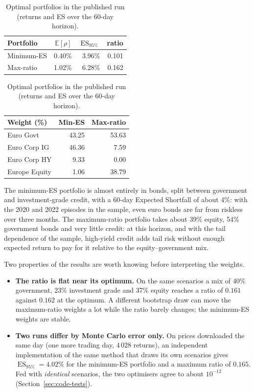 \documentclass[11pt,a4paper]{article}
\newcommand{\ES}{\operatorname{ES}}
\newcommand{\E}{\mathbb{E}}
\theoremstyle{plain}
\theoremstyle{remark}
\begin{document}
\begin{table}[htbp]
\centering
\begin{tabular}{lrrr}
\toprule
Portfolio & $\E[\rho]$ & $\ES_{95\%}$ & ratio \\
\midrule
Minimum-ES & 0.40\% & 3.96\% & 0.101 \\
Max-ratio  & 1.02\% & 6.28\% & 0.162 \\
\bottomrule
\end{tabular}
\qquad
\begin{tabular}{lrr}
\toprule
Weight (\%) & Min-ES & Max-ratio \\
\midrule
Euro Govt      & 43.25 & 53.63 \\
Euro Corp IG   & 46.36 &  7.59 \\
Euro Corp HY   &  9.33 &  0.00 \\
Europe Equity  &  1.06 & 38.79 \\
\bottomrule
\end{tabular}
\caption{Optimal portfolios in the published run (returns and ES over the
60-day horizon).}
\label{tab:results}
\end{table}

The minimum-ES portfolio is almost entirely in bonds, split between
government and investment-grade credit, with a 60-day Expected Shortfall of
about 4\%: with the 2020 and 2022 episodes in the sample, even euro bonds
are far from riskless over three months. The
maximum-ratio portfolio takes about 39\% equity, 54\% government bonds and
very little credit: at this horizon, and with the tail dependence of the
sample, high-yield credit adds tail risk without enough expected return to
pay for it relative to the equity--government mix.

Two properties of the results are worth knowing before interpreting the
weights.
\begin{itemize}[nosep]
  \item \textbf{The ratio is flat near its optimum.} On the same scenarios a
        mix of 40\% government, 23\% investment grade and 37\% equity reaches
        a ratio of $0.161$ against $0.162$ at the optimum. A different
        bootstrap draw can move the maximum-ratio weights a lot while the
        ratio barely changes; the minimum-ES weights are stable.
  \item \textbf{Two runs differ by Monte Carlo error only.} On prices
        downloaded the same day (one more trading day, $4\,028$ returns), an
        independent implementation of the same method that draws its own
        scenarios gives $\ES_{95\%} = 4.02\%$ for the minimum-ES
        portfolio and a maximum ratio of $0.165$. Fed with \emph{identical}
        scenarios, the two optimisers agree to about $10^{-12}$
        (Section~\ref{sec:code-tests}).
\end{itemize}
\end{document}
